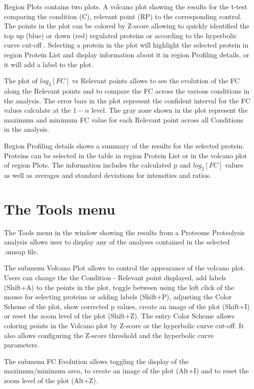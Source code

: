 Region Plots contains two plots. A volcano plot showing the results for the t-test
comparing the condition (C), relevant point (RP) to the corresponding control. The
points in the plot can be colored by Z-score allowing to quickly identified the top
up (blue) or down (red) regulated proteins or according to the hyperbolic curve cut-off
\cite{LI2012}. Selecting a protein in the plot will highlight the selected protein
in region Protein List and display information about it in region Profiling details,
or it will add a label to the plot.

The plot of $log_2[FC]$ vs Relevant points allows to see the evolution of the FC
along the Relevant points and to compare the FC across the various conditions in
the analysis. The error bars in the plot represent the confident interval for the
FC values calculate at the $1-\alpha$ level. The gray zone shown in the plot represent
the maximum and minimum FC value for each Relevant point across all Conditions in
the analysis.

Region Profiling details shows a summary of the results for the selected protein.
Proteins can be selected in the table in region Protein List or in the volcano plot
of region Plots. The information includes the calculated p and $log_2[FC]$ values
as well as averages and standard deviations for intensities and ratios.

\section{The Tools menu}
\label{sec:protprofTools}

The Tools menu in the window showing the results from a Proteome Proteolysis analysis
allows user to display any of the analyses contained in the selected .umsap file.

The submenu Volcano Plot allows to control the appearance of the volcano plot. Users
can change the the Condition - Relevant point displayed, add labels (Shift+A) to
the points in the plot, toggle between using the left click of the mouse for selecting
proteins or adding labels (Shift+P), adjusting the Color Scheme of the plot, show
corrected p values, create an image of the plot (Shift+I) or reset the zoom level of
the plot (Shift+Z). The entry Color Scheme allows coloring points in the Volcano plot
by Z-score or the hyperbolic curve cut-off. It also allows configuring the Z-score
threshold and the hyperbolic curve parameters.

The submenu FC Evolution allows toggling the display of the maximum/minimum area,
to create an image of the plot (Alt+I) and to reset the zoom level of the plot (Alt+Z).

